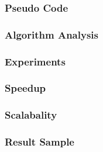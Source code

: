 \documentclass[11pt]{article}
\begin{document}
\subsubsection {Pseudo Code}
\subsubsection {Algorithm Analysis}
\subsubsection {Experiments}
\subsubsection {Speedup}
\subsubsection {Scalabality}
\subsubsection {Result Sample}
\end{document}
